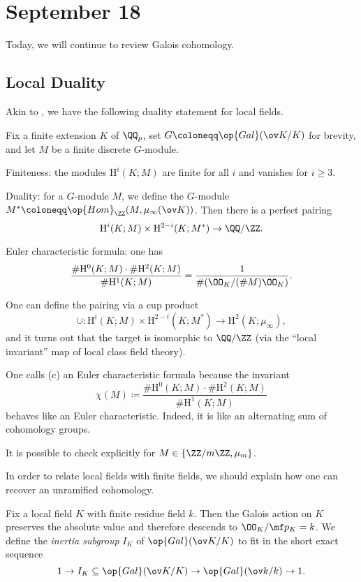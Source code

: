 \documentclass[../notes.tex]{subfiles}
\begin{document}
\section{September 18}
Today, we will continue to review Galois cohomology.

\subsection{Local Duality}
Akin to , we have the following duality statement for local fields.
\begin{theorem}[Tate] \label{thm:tate}
	Fix a finite extension $K$ of $\QQ_p$, set $G\coloneqq\op{Gal}(\ov K/K)$ for brevity, and let $M$ be a finite discrete $G$-module.
	\begin{listalph}
		\item Finiteness: the modules $\mathrm H^i(K;M)$ are finite for all $i$ and vanishes for $i\ge3$.
		\item Duality: for a $G$-module $M$, we define the $G$-module $M^*\coloneqq\op{Hom}_\ZZ(M,\mu_\infty(\ov K))$. Then there is a perfect pairing
		\[\mathrm H^i(K;M)\times\mathrm H^{2-i}(K;M^*)\to\QQ/\ZZ.\]
		\item Euler characteristic formula: one has
		\[\frac{\#\mathrm H^0(K;M)\cdot\#\mathrm H^2(K;M)}{\#\mathrm H^1(K;M)}=\frac1{\#(\OO_K/(\#M)\OO_K)}.\]
	\end{listalph}
\end{theorem}
\begin{remark}
	One can define the pairing via a cup product
	\[\cup\colon\mathrm H^i(K;M)\times\mathrm H^{2-i}(K;M^*)\to\mathrm H^2(K;\mu_\infty),\]
	and it turns out that the target is isomorphic to $\QQ/\ZZ$ (via the ``local invariant'' map of local class field theory).
\end{remark}
\begin{remark}
	One calls (c) an Euler characteristic formula because the invariant
	\[\chi(M)\coloneqq\frac{\#\mathrm H^0(K;M)\cdot\#\mathrm H^2(K;M)}{\#\mathrm H^1(K;M)}\]
	behaves like an Euler characteristic. Indeed, it is like an alternating sum of cohomology groups.
\end{remark}
\begin{remark}
	It is possible to check  explicitly for $M\in\{\ZZ/m\ZZ,\mu_m\}$.
\end{remark}
In order to relate local fields with finite fields, we should explain how one can recover an unramified cohomology.
\begin{definition}
	Fix a local field $K$ with finite residue field $k$. Then the Galois action on $K$ preserves the absolute value and therefore descends to $\OO_K/\mf p_K=k$. We define the \textit{inertia subgroup} $I_K$ of $\op{Gal}(\ov K/K)$ to fit in the short exact sequence
	\[1\to I_K\subseteq\op{Gal}(\ov K/K)\to\op{Gal}(\ov k/k)\to1.\]
\end{definition}
\end{document}
